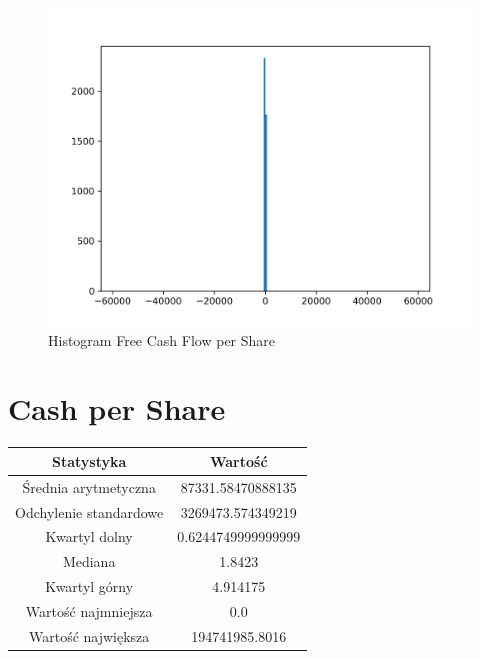 \documentclass{article}
\begin{document}
\begin{figure}[h!]
    \includegraphics[width=\linewidth]{variables/Free Cash Flow per Share.png}
    \caption{Histogram Free Cash Flow per Share }
\end{figure}\section{ Cash per Share }

\begin{center}
    \begin{tabular}{|c | c|} 
    \hline
    Statystyka & Wartość \\
    \hline\hline
    Średnia arytmetyczna & 87331.58470888135 \\ 
    \hline
    Odchylenie standardowe & 3269473.574349219 \\
    \hline
    Kwartyl dolny & 0.6244749999999999 \\
    \hline
    Mediana & 1.8423 \\
    \hline
    Kwartyl górny & 4.914175 \\
    \hline
    Wartość najmniejsza & 0.0 \\
    \hline
    Wartość największa & 194741985.8016 \\
    \hline
   \end{tabular}
\end{center}
\end{document}
